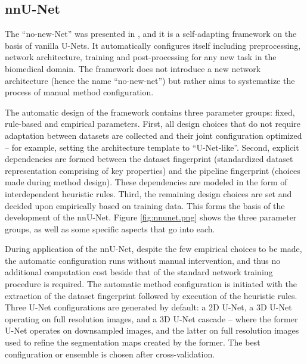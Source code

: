 \subsection{nnU-Net}
The ``no-new-Net'' was presented in \citeyear{nnUnet}, and it is a self-adapting framework on the basis of vanilla U-Nets. It automatically configures itself including preprocessing, network architecture, training and post-processing for any new task in the biomedical domain. The framework does not introduce a new network architecture (hence the name ``no-new-net'') but rather aims to systematize the process of manual method configuration.

The automatic design of the framework contains three parameter groups: fixed, rule-based and empirical parameters. First, all design choices that do not require adaptation between datasets are collected and their joint configuration optimized -- for example, setting the architecture template to ``U-Net-like''. Second, explicit dependencies are formed between the dataset fingerprint (standardized dataset representation comprising of key properties) and the pipeline fingerprint (choices made during method design). These dependencies are modeled in the form of interdependent heuristic rules. Third, the remaining design choices are set and decided upon empirically based on training data. This forms the basis of the development of the nnU-Net. Figure \ref{fig:nnunet.png} shows the three parameter groups, as well as some specific aspects that go into each.


During application of the nnU-Net, despite the few empirical choices to be made, the automatic configuration runs without manual intervention, and thus no additional computation cost beside that of the standard network training procedure is required. The automatic method configuration is initiated with the extraction of the dataset fingerprint followed by execution of the heuristic rules. Three U-Net configurations are generated by default: a 2D U-Net, a 3D U-Net operating on full resolution images, and a 3D U-Net cascade -- where the former U-Net operates on downsampled images, and the latter on full resolution images used to refine the segmentation maps created by the former. The best configuration or ensemble is chosen after cross-validation. 

